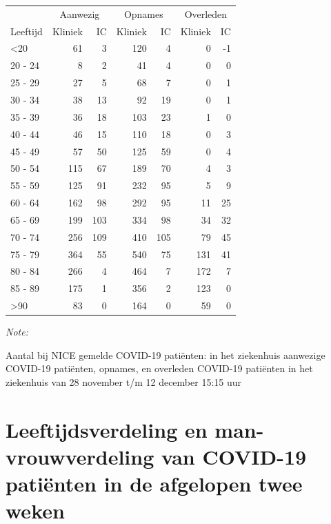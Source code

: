 \documentclass[
  english,
  man,floatsintext]{apa6}
\begin{document}
\begin{table}
\centering\begingroup\fontsize{10}{12}\selectfont

\begin{threeparttable}
\begin{tabular}{lrrrrrr}
\toprule
\multicolumn{1}{c}{ } & \multicolumn{2}{c}{Aanwezig} & \multicolumn{2}{c}{Opnames} & \multicolumn{2}{c}{Overleden} \\
\cmidrule(l{3pt}r{3pt}){2-3} \cmidrule(l{3pt}r{3pt}){4-5} \cmidrule(l{3pt}r{3pt}){6-7}
Leeftijd & Kliniek & IC & Kliniek & IC & Kliniek & IC\\
\midrule
<20 & 61 & 3 & 120 & 4 & 0 & -1\\
20 - 24 & 8 & 2 & 41 & 4 & 0 & 0\\
25 - 29 & 27 & 5 & 68 & 7 & 0 & 1\\
30 - 34 & 38 & 13 & 92 & 19 & 0 & 1\\
35 - 39 & 36 & 18 & 103 & 23 & 1 & 0\\
40 - 44 & 46 & 15 & 110 & 18 & 0 & 3\\
45 - 49 & 57 & 50 & 125 & 59 & 0 & 4\\
50 - 54 & 115 & 67 & 189 & 70 & 4 & 3\\
55 - 59 & 125 & 91 & 232 & 95 & 5 & 9\\
60 - 64 & 162 & 98 & 292 & 95 & 11 & 25\\
65 - 69 & 199 & 103 & 334 & 98 & 34 & 32\\
70 - 74 & 256 & 109 & 410 & 105 & 79 & 45\\
75 - 79 & 364 & 55 & 540 & 75 & 131 & 41\\
80 - 84 & 266 & 4 & 464 & 7 & 172 & 7\\
85 - 89 & 175 & 1 & 356 & 2 & 123 & 0\\
>90 & 83 & 0 & 164 & 0 & 59 & 0\\
\bottomrule
\end{tabular}
\begin{tablenotes}
\item \textit{Note: } 
\item Aantal bij NICE gemelde COVID-19 patiënten: in het ziekenhuis aanwezige COVID-19 patiënten, opnames, en overleden COVID-19 patiënten in het ziekenhuis van 28 november t/m 12 december 15:15 uur
\end{tablenotes}
\end{threeparttable}
\endgroup{}
\end{table}

\newpage

\hypertarget{leeftijdsverdeling-en-man-vrouwverdeling-van-covid-19-patiuxebnten-in-de-afgelopen-twee-weken}{%
\section{Leeftijdsverdeling en man-vrouwverdeling van COVID-19 patiënten in de afgelopen twee weken}\label{leeftijdsverdeling-en-man-vrouwverdeling-van-covid-19-patiuxebnten-in-de-afgelopen-twee-weken}}
\end{document}
